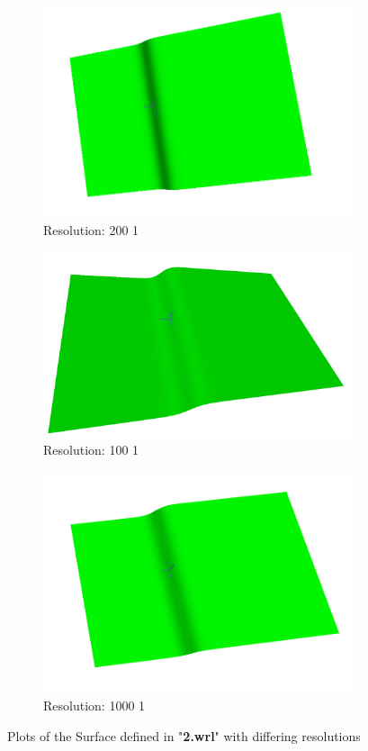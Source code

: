 \documentclass[acmlarge,nonacm=true]{acmart}
\begin{document}
\begin{figure}[H]
	\begin{subfigure}{.33\textwidth}
	  \centering
	  \includegraphics[width=.8\linewidth]{fig/2_200_1}
	  \caption{Resolution: 200 1}
	\end{subfigure}%
	\begin{subfigure}{.33\textwidth}
	  \centering
	  \includegraphics[width=.8\linewidth]{fig/2_100_1}
	  \caption{Resolution: 100 1}
	\end{subfigure}
	\begin{subfigure}{.33\textwidth}
		\centering
		\includegraphics[width=.8\linewidth]{fig/2_1000_1}
		\caption{Resolution: 1000 1}
	  \end{subfigure}
	\caption{Plots of the Surface defined in "\textbf{2.wrl}" with differing resolutions}
	\label{fig:2}
\end{figure}
\end{document}
